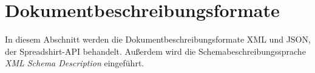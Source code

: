 \section{Dokumentbeschreibungsformate}
\label{sec:document_description_formats}

In diesem Abschnitt werden die Dokumentbeschreibungsformate \gls{XML} und \gls{JSON}, der Spreadshirt-API behandelt. Außerdem wird die Schemabeschreibungssprache \emph{XML Schema Description} eingeführt.






